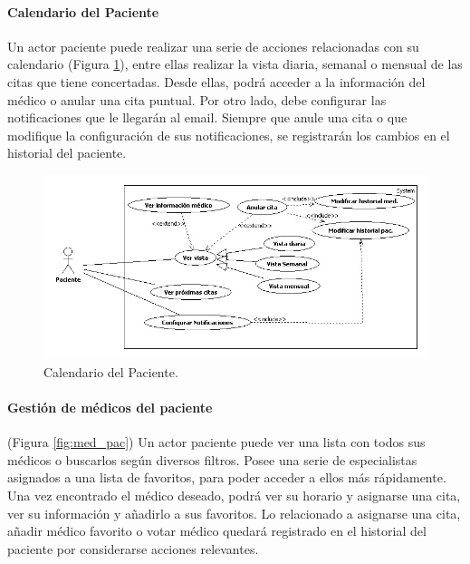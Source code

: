 \documentclass[a4paper,oneside,11pt]{book}
\begin{document}
			\paragraph{Calendario del Paciente} %
			\label{par:calendario_del_paciente}
				Un actor paciente puede realizar una serie de acciones relacionadas con su calendario (Figura \ref{fig:cal_pac}), entre ellas realizar la vista diaria, semanal o mensual de las citas que tiene concertadas. Desde ellas, podrá acceder a la información del médico o anular una cita puntual. Por otro lado, debe configurar las notificaciones que le llegarán al email. Siempre que anule una cita o que modifique la configuración de sus notificaciones, se registrarán los cambios en el historial del paciente.
				\begin{figure}[H]
				  \centering
				    \includegraphics[width=14cm]{img/jpg/casos_uso/Calendario_del_paciente.jpg}
				  \caption{Calendario del Paciente.}
				  \label{fig:cal_pac}
				\end{figure}
		
			\paragraph{Gestión de médicos del paciente} %
			\label{par:gestion_de_medicos_del_paciente}
			
				(Figura \ref{fig:med_pac}) Un actor paciente puede ver una lista con todos sus médicos o buscarlos según diversos filtros. Posee una serie de especialistas asignados a una lista de favoritos, para poder acceder a ellos más rápidamente. Una vez encontrado el médico deseado, podrá ver su horario y asignarse una cita, ver su información y añadirlo a sus favoritos. Lo relacionado a asignarse una cita, añadir médico favorito o votar médico quedará registrado en el historial del paciente por considerarse acciones relevantes.
				
\end{document}
